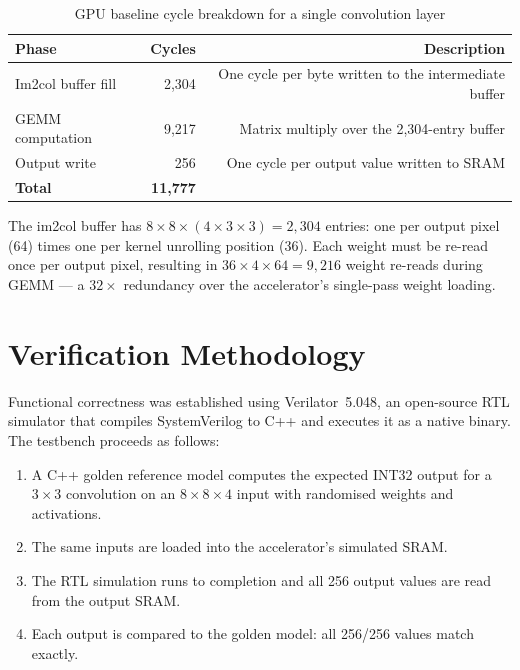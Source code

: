 \documentclass[11pt, letterpaper]{article}
\begin{document}
\begin{table}[h]
\centering
\caption{GPU baseline cycle breakdown for a single convolution layer}
\begin{tabular}{lrr}
\toprule
\textbf{Phase} & \textbf{Cycles} & \textbf{Description} \\
\midrule
Im2col buffer fill  & 2,304  & One cycle per byte written to the intermediate buffer \\
GEMM computation    & 9,217  & Matrix multiply over the 2,304-entry buffer \\
Output write        & 256    & One cycle per output value written to SRAM \\
\midrule
\textbf{Total}      & \textbf{11,777} & \\
\bottomrule
\end{tabular}
\end{table}

The im2col buffer has $8 \times 8 \times (4 \times 3 \times 3) = 2{,}304$
entries: one per output pixel (64) times one per kernel unrolling position
(36). Each weight must be re-read once per output pixel, resulting in
$36 \times 4 \times 64 = 9{,}216$ weight re-reads during GEMM — a $32\times$
redundancy over the accelerator's single-pass weight loading.

\section{Verification Methodology}

Functional correctness was established using Verilator~5.048, an
open-source RTL simulator that compiles SystemVerilog to C++ and executes it
as a native binary. The testbench proceeds as follows:

\begin{enumerate}
  \item A C++ golden reference model computes the expected INT32 output for
        a $3 \times 3$ convolution on an $8 \times 8 \times 4$ input with
        randomised weights and activations.
  \item The same inputs are loaded into the accelerator's simulated SRAM.
  \item The RTL simulation runs to completion and all 256 output values are
        read from the output SRAM.
  \item Each output is compared to the golden model: all 256/256 values
        match exactly.
\end{enumerate}
\end{document}
